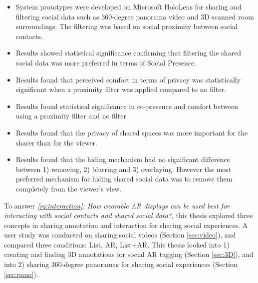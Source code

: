\begin{itemize}
    \item{System prototypes were developed on Microsoft HoloLens for sharing and filtering social data such as 360-degree panorama video and 3D scanned room surroundings. The filtering was based on social proximity between social contacts.}
    \item{Results showed statistical significance confirming that filtering the shared social data was more preferred in terms of Social Presence.}
    \item{Results found that perceived comfort in terms of privacy was statistically significant when a proximity filter was applied compared to no filter.}
    \item{Results found statistical significance in co-presence and comfort between using a proximity filter and no filter}
    \item{Results found that the privacy of shared spaces was more important for the sharer than for the viewer.}
    \item{Results found that the hiding mechanism had no significant difference between 1) removing, 2) blurring and 3) overlaying. However the most preferred mechanism for hiding shared social data was to remove them completely from the viewer's view.}
\end{itemize}

\noindent
To answer \textit{\ref{rq:interaction}: How wearable AR displays can be used best for interacting with social contacts and shared social data?}, this thesis explored three concepts in sharing annotation and interaction for sharing social experiences. A user study was conducted on sharing social videos (Section \ref{sec:video}), and compared three conditions: List, AR, List+AR. This thesis looked into 1) creating and finding 3D annotations for social AR tagging (Section \ref{sec:3D}), and into 2) sharing 360-degree panoramas for sharing social experiences (Section \ref{sec:pano}). 

